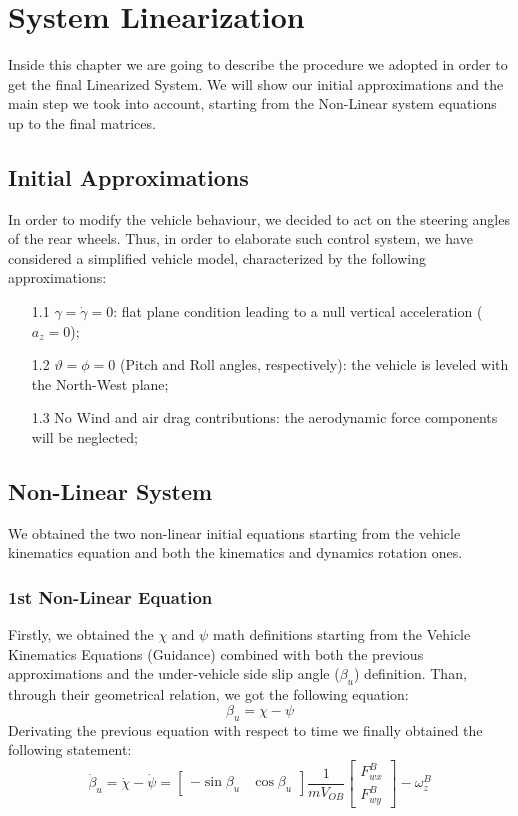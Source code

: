 
\chapter{System Linearization}
	Inside this chapter we are going to describe the procedure we adopted in order to get the final Linearized System. We will show our initial approximations and the main step we took into account, starting from the Non-Linear system equations up to the final matrices. 
\section{Initial Approximations} \label{approx}
	In order to modify the vehicle behaviour, we decided to act on the steering angles of the rear wheels. Thus, in order to elaborate such control system, we have considered a simplified vehicle model, characterized by the following approximations:
		\begin{itemize}
			\item[1.1] $ \gamma=\dot{\gamma}=0 $: flat plane condition leading to a null vertical acceleration ($ a_{z}=0 $);
			\item[1.2] $\vartheta = \phi = 0$ (Pitch and Roll angles, respectively): the vehicle is leveled with the North-West plane; 
			\item[1.3] No Wind and air drag contributions: the aerodynamic force components will be neglected;
		\end{itemize} 
\section{Non-Linear System}
	We obtained the two non-linear initial equations starting from the vehicle kinematics equation and both the kinematics and dynamics rotation ones.
\subsection{1st Non-Linear Equation} 	
	Firstly, we obtained the $\chi$ and $\psi$ math definitions starting from the Vehicle Kinematics Equations (Guidance) combined with both the previous approximations and the under-vehicle side slip angle ($\beta_{u}$) definition. Than, through their geometrical relation, we got the following equation:
		\begin{equation}
			\beta_{u} = \chi - \psi
		\end{equation}
	Derivating the previous equation with respect to time we finally obtained the following statement:
		\begin{equation} \label{Betaudot}
			\dot{\beta}_{u} = \dot\chi - \dot\psi = 
			\begin{bmatrix}
			- \sin\beta_{u} & \cos\beta_{u}
			\end{bmatrix}
			\frac{1}{mV_{OB}}
			\begin{bmatrix}
			F_{wx}^{B} \\ F_{wy}^{B}
			\end{bmatrix}
			-\omega_{z}^{B}
		\end{equation}
